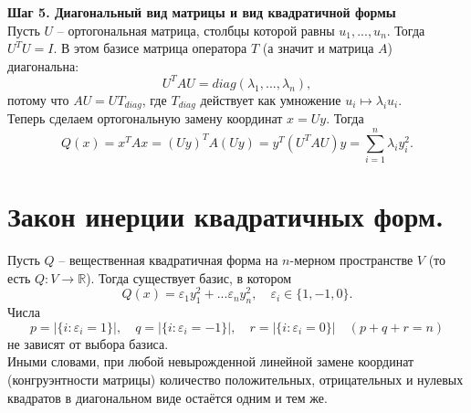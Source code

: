 \documentclass[14pt]{extreport}
\begin{document}
\begin{prbox}
        \textbf{Шаг 5. Диагональный вид матрицы и вид квадратичной формы}\\
        Пусть $U$ – ортогональная матрица, столбцы которой равны $u_1,...,u_n$. Тогда $U^TU = I$. В этом базисе матрица оператора $T$ (а значит и матрица $A$) диагональна:
        \[
        U^TAU = diag(\lambda_1,...,\lambda_n),
        \]
        потому что $AU = UT_{diag}$, где $T_{diag}$ действует как умножение $u_i \mapsto \lambda_i u_i$.\\
        Теперь сделаем ортогональную замену координат $x = Uy$. Тогда
        \[
        Q(x) = x^TAx = (Uy)^T A (Uy) = y^T (U^TAU) y = \sum_{i=1}^n \lambda_i y_i^2.
        \]
    \end{prbox}

    

    \chapter{Закон инерции квадратичных форм.}

    \begin{thbox}
        Пусть $Q$ – вещественная квадратичная форма на $n$-мерном пространстве $V$ (то есть $Q: V \rightarrow \mathbb{R}$). Тогда существует базис, в котором
        \[
        Q(x) = \varepsilon_1y_1^2 + ... \varepsilon_ny_n^2, \quad \varepsilon_i \in \{ 1,-1,0 \}.
        \]
        Числа
        \[
        p = \bigl| \{ i:\varepsilon_i=1 \} \bigr|, \quad q = \bigl| \{ i:\varepsilon_i=-1 \} \bigr|, \quad r = \bigl| \{ i:\varepsilon_i=0 \} \bigr| \quad (p+q+r=n)
        \]
        не зависят от выбора базиса.\\
        Иными словами, при любой невырожденной линейной замене координат (конгруэнтности матрицы) количество положительных, отрицательных и нулевых квадратов в диагональном виде остаётся одним и тем же.
    \end{thbox}
\end{document}
